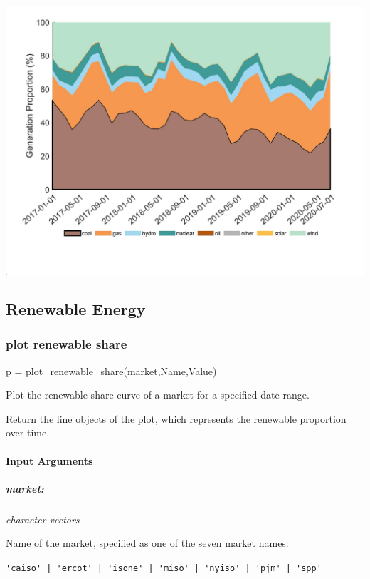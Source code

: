 \documentclass[11pt]{article}
\numberwithin{equation}{section}
\numberwithin{table}{section}
\numberwithin{figure}{section}
\begin{document}
\begin{center}
  \noindent\includegraphics[width=\textwidth]{figures/plot_generation_mix_example5.jpg}
\end{center}





\subsection{Renewable Energy}
\subsubsection{plot renewable share}
\begin{Code}
  p = plot_renewable_share(market,Name,Value)
\end{Code}

Plot the renewable share curve of a market for a specified date range.

Return the line objects of the plot, which represents the renewable proportion over time.



\paragraph{Input Arguments}
\subparagraph{market:} \textit{character vectors}

Name of the market, specified as one of the seven market names:

\verb!'caiso' | 'ercot' | 'isone' | 'miso' | 'nyiso' | 'pjm' | 'spp'!
\end{document}
